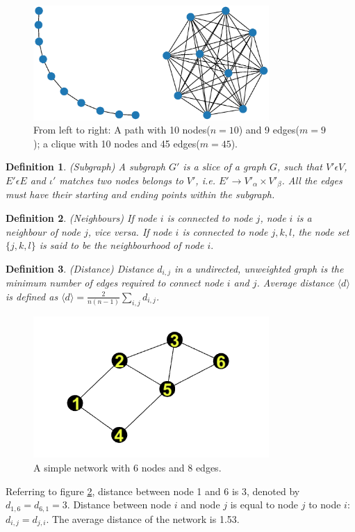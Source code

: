 \documentclass[12pt]{article}
\newtheorem{definition}{Definition}[section]
\begin{document}
\begin{figure}[!h]
    \centering
    \includegraphics[width=0.8\textwidth]{path_clique.eps}
    \caption{From left to right: A path with 10 nodes($n=10$) and 9 edges($m=9$); a clique with 10 nodes and 45 edges($m=45$).}
    \label{fig:path_clique}
\end{figure}
\begin{definition}{(Subgraph)}
    A subgraph $G'$ is a slice of a graph $G$, such that $V' \epsilon V$, $E' \epsilon E$ and $\iota'$ matches two nodes belongs to $V'$, i.e. $E'\rightarrow V'_\alpha\times V'_\beta $. All the edges must have their starting and ending points within the subgraph.
\end{definition}
\begin{definition}{(Neighbours)}
    If node $i$ is connected to node $j$, node $i$ is a neighbour of node $j$, vice versa. If node $i$ is connected to node $j,k,l$, the node set $\{j,k,l\}$ is said to be the neighbourhood of node $i.$
\end{definition}
\begin{definition}{(Distance)}
    Distance $d_{i,j}$ in a undirected, unweighted graph is the minimum number of edges required to connect node $i$ and $j$. Average distance $\langle d\rangle$ is defined as $\langle d \rangle = \frac{2}{n(n-1)}\sum_{i,j}d_{i,j}$.
\end{definition}
\begin{figure}[!h]
    \centering
    \includegraphics[width=0.8\textwidth]{simplenetwork.png}
    \caption{A simple network with 6 nodes and 8 edges.}
    \label{fig:simple_network}
\end{figure}
\par
Referring to figure \ref{fig:simple_network}, distance between node 1 and 6 is 3, denoted by $d_{1,6}=d_{6,1}=3$. Distance between node $i$ and node $j$ is equal to node $j$ to node $i$: $d_{i,j}=d_{j,i}$. The average distance of the network is 1.53.
\end{document}
